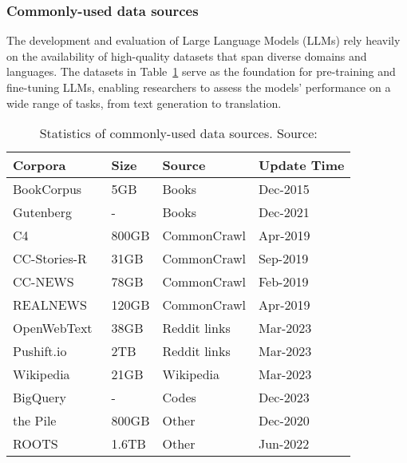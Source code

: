 \subsubsection{Commonly-used data sources}
\label{subsubsec:commonly-used-data-sources}

The development and evaluation of Large Language Models (LLMs) rely heavily on the availability of high-quality datasets that span diverse domains and languages.
The datasets in Table~\ref{tab:table} serve as the foundation for pre-training and fine-tuning LLMs, enabling researchers to assess the models' performance on a wide range of tasks, from text generation to translation.\\

\begin{table}[h]
	\centering
	\begin{tabularx}{\textwidth}{|X|X|X|X|}
		\hline
		\textbf{Corpora}                           & \textbf{Size} & \textbf{Source} & \textbf{Update Time} \\
		\hline
		BookCorpus~\cite{zhu2015aligning}          & 5GB           & Books           & Dec-2015             \\
		Gutenberg~\cite{projectgutenberg}          & -             & Books           & Dec-2021             \\
		C4~\cite{raffel2023exploring}              & 800GB         & CommonCrawl     & Apr-2019             \\
		CC-Stories-R~\cite{trinh2018simple}        & 31GB          & CommonCrawl     & Sep-2019             \\
		CC-NEWS~\cite{liu2019roberta}              & 78GB          & CommonCrawl     & Feb-2019             \\
		REALNEWS~\cite{zellers2019defending}       & 120GB         & CommonCrawl     & Apr-2019             \\
		OpenWebText~\cite{gokaslan2019openwebtext} & 38GB          & Reddit links    & Mar-2023             \\
		Pushift.io~\cite{baumgartner2020pushshift} & 2TB           & Reddit links    & Mar-2023             \\
		Wikipedia~\cite{wikipedia}                 & 21GB          & Wikipedia       & Mar-2023             \\
		BigQuery~\cite{bigquerydataset}            & -             & Codes           & Dec-2023             \\
		the Pile~\cite{gao2021pile}                & 800GB         & Other           & Dec-2020             \\
		ROOTS~\cite{laurencon2022bigscience}       & 1.6TB         & Other           & Jun-2022             \\
		\hline
	\end{tabularx}
	\caption{Statistics of commonly-used data sources. Source: \textcite{survey}}
	\label{tab:table}
\end{table}

